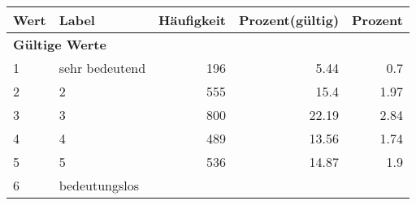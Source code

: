      \begin{longtable}{lXrrr}
     \toprule
     \textbf{Wert} & \textbf{Label} & \textbf{Häufigkeit} & \textbf{Prozent(gültig)} & \textbf{Prozent} \\
     \endhead
     \midrule
     \multicolumn{5}{l}{\textbf{Gültige Werte}}\\

     1 &
     \multicolumn{1}{X}{ sehr bedeutend   } &


       \num{196} &
       \num[round-mode=places,round-precision=2]{5.44} &
         \num[round-mode=places,round-precision=2]{0.7} \\

     2 &
     \multicolumn{1}{X}{ 2   } &


       \num{555} &
       \num[round-mode=places,round-precision=2]{15.4} &
         \num[round-mode=places,round-precision=2]{1.97} \\

     3 &
     \multicolumn{1}{X}{ 3   } &


       \num{800} &
       \num[round-mode=places,round-precision=2]{22.19} &
         \num[round-mode=places,round-precision=2]{2.84} \\

     4 &
     \multicolumn{1}{X}{ 4   } &


       \num{489} &
       \num[round-mode=places,round-precision=2]{13.56} &
         \num[round-mode=places,round-precision=2]{1.74} \\

     5 &
     \multicolumn{1}{X}{ 5   } &


       \num{536} &
       \num[round-mode=places,round-precision=2]{14.87} &
         \num[round-mode=places,round-precision=2]{1.9} \\

     6 &
     \multicolumn{1}{X}{ bedeutungslos   } &



\end{longtable}
